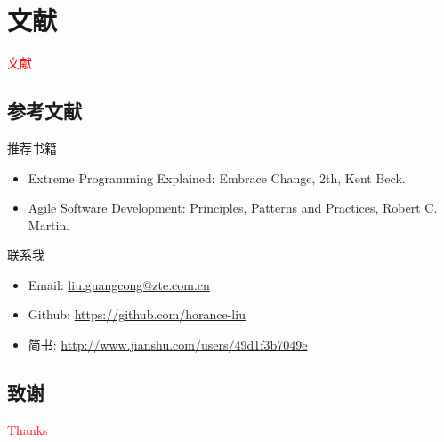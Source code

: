 \section{文献}
\label{sec:reference}

\begin{frame}
  \begin{center}
    \Huge{\textcolor{red}{文献}}
  \end{center}
\end{frame}

\subsection{参考文献}

\begin{frame}{推荐书籍}
    \begin{itemize}
    \item \alert{Extreme Programming Explained: Embrace Change, 2th}, Kent Beck.
    \item \alert{Agile Software Development: Principles, Patterns and Practices}, Robert C. Martin.
    \end{itemize}
\end{frame}

\begin{frame}{联系我}
    \begin{itemize}
    \item \alert{Email}: \href{liu.guangcong@zte.com.cn}{liu.guangcong@zte.com.cn}
    \item \alert{Github}: \href{https://github.com/horance-liu}{https://github.com/horance-liu}    
    \item \alert{简书}: \href{http://www.jianshu.com/users/49d1f3b7049e}{http://www.jianshu.com/users/49d1f3b7049e}
    \end{itemize}
\end{frame}

\subsection{致谢}

\begin{frame}{}
  \begin{center}
    \Huge{\textcolor{red}{Thanks}}
  \end{center}
\end{frame}